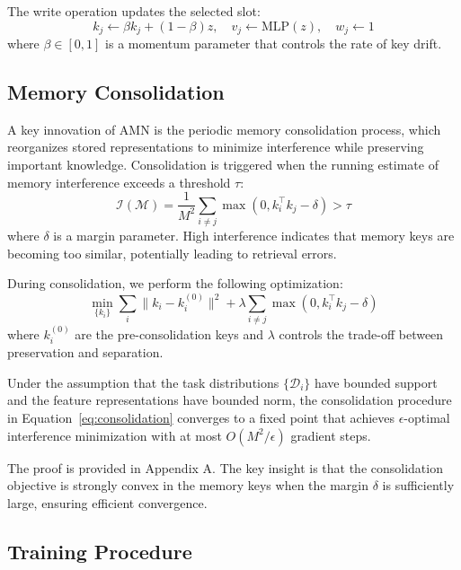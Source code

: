 \documentclass[11pt]{article}
\begin{document}
The write operation updates the selected slot:
\begin{equation}
    k_j \leftarrow \beta k_j + (1 - \beta) z, \quad v_j \leftarrow \text{MLP}(z), \quad w_j \leftarrow 1
\end{equation}
where $\beta \in [0, 1]$ is a momentum parameter that controls the rate of key drift.

\subsection{Memory Consolidation}
\label{sec:consolidation}

A key innovation of AMN is the periodic memory consolidation process, which reorganizes stored representations to minimize interference while preserving important knowledge. Consolidation is triggered when the running estimate of memory interference exceeds a threshold $\tau$:
\begin{equation}
    \mathcal{I}(\mathcal{M}) = \frac{1}{M^2} \sum_{i \neq j} \max(0, k_i^\top k_j - \delta) > \tau
\end{equation}
where $\delta$ is a margin parameter. High interference indicates that memory keys are becoming too similar, potentially leading to retrieval errors.

During consolidation, we perform the following optimization:
\begin{equation}
    \min_{\{k_i\}} \sum_{i} \|k_i - k_i^{(0)}\|^2 + \lambda \sum_{i \neq j} \max(0, k_i^\top k_j - \delta)
    \label{eq:consolidation}
\end{equation}
where $k_i^{(0)}$ are the pre-consolidation keys and $\lambda$ controls the trade-off between preservation and separation.

\begin{theorem}
\label{thm:convergence}
Under the assumption that the task distributions $\{\mathcal{D}_i\}$ have bounded support and the feature representations have bounded norm, the consolidation procedure in Equation~\ref{eq:consolidation} converges to a fixed point that achieves $\epsilon$-optimal interference minimization with at most $O(M^2 / \epsilon)$ gradient steps.
\end{theorem}

The proof is provided in Appendix A. The key insight is that the consolidation objective is strongly convex in the memory keys when the margin $\delta$ is sufficiently large, ensuring efficient convergence.

\subsection{Training Procedure}
\end{document}
